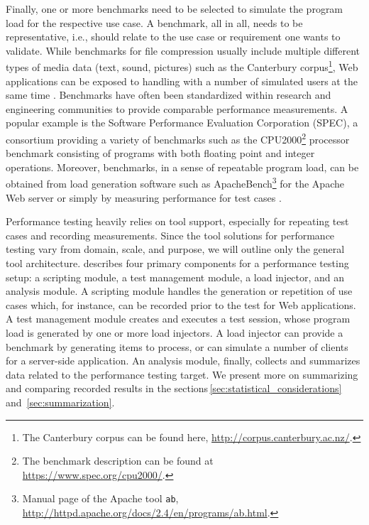 Finally, one or more benchmarks need to be selected to simulate  the program
load for the respective use case. A benchmark, all in all, needs to be
representative, i.e., should relate to the use case or requirement one
 wants to validate. While benchmarks for file compression usually include
multiple different types of media data (text, sound, pictures) such as the
Canterbury corpus\footnote{The Canterbury corpus can be found
here, \url{http://corpus.canterbury.ac.nz/}.}, Web applications can be exposed
to handling with a number of simulated users at the same time
\citep{molyneaux_art_2014}. Benchmarks have often been standardized within
research and engineering communities to provide comparable performance
measurements. A popular example is the Software Performance Evaluation
Corporation (SPEC), a consortium providing a variety of benchmarks such as the
CPU2000\footnote{The benchmark description can be found at \url{https://www.spec.org/cpu2000/}.} processor benchmark consisting of programs with both floating point and integer operations.
Moreover, benchmarks, in a sense of repeatable program load, can be obtained
from load generation software such as ApacheBench\footnote{Manual page of the
Apache tool \texttt{ab}, \url{http://httpd.apache.org/docs/2.4/en/programs/ab.html}.}
for the Apache Web server or simply by measuring performance for test cases
\citep{heger_automated_2013,nguyen_industrial_2014}.

Performance testing heavily relies on tool support, especially for repeating
test cases and recording measurements. Since the
tool solutions for performance testing vary from domain, scale, and purpose, we
will outline  only the general tool architecture. \cite{molyneaux_art_2014}
describes four primary components for a performance testing setup: a scripting module, a
test management module, a load injector, and an analysis module. A scripting module handles the generation or
repetition of use cases which, for instance, can be recorded prior to the test
for Web applications. A test management module creates and executes a test
session, whose program load is generated by one or more load injectors. A load
injector can provide a benchmark by generating items to process, or can simulate
a number of clients for a server-side application. An analysis module, finally,
collects and summarizes data related to the performance testing target. We present more on
summarizing and comparing recorded results in the
sections\,\ref{sec:statistical_considerations} and~\ref{sec:summarization}.


